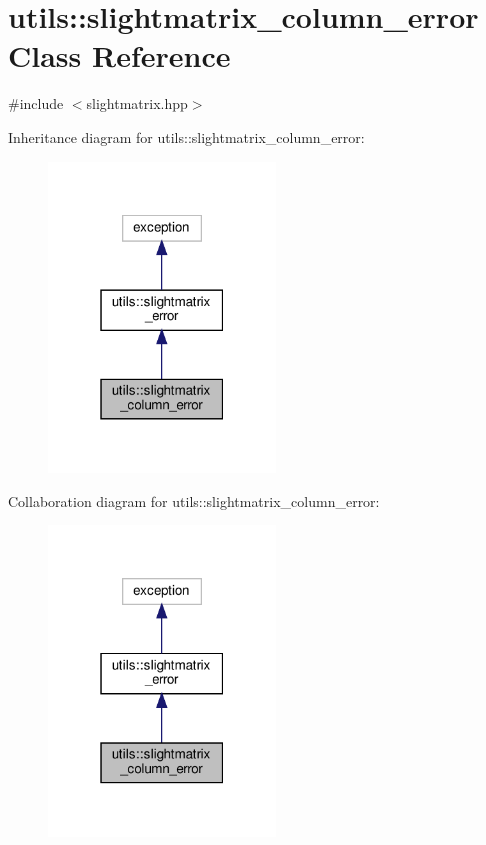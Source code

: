 \hypertarget{classutils_1_1slightmatrix__column__error}{}\section{utils\+:\+:slightmatrix\+\_\+column\+\_\+error Class Reference}
\label{classutils_1_1slightmatrix__column__error}


{\ttfamily \#include $<$slightmatrix.\+hpp$>$}



Inheritance diagram for utils\+:\+:slightmatrix\+\_\+column\+\_\+error\+:
\nopagebreak
\begin{figure}[H]
\begin{center}
\leavevmode
\includegraphics[width=171pt]{classutils_1_1slightmatrix__column__error__inherit__graph}
\end{center}
\end{figure}


Collaboration diagram for utils\+:\+:slightmatrix\+\_\+column\+\_\+error\+:
\nopagebreak
\begin{figure}[H]
\begin{center}
\leavevmode
\includegraphics[width=171pt]{classutils_1_1slightmatrix__column__error__coll__graph}
\end{center}
\end{figure}


